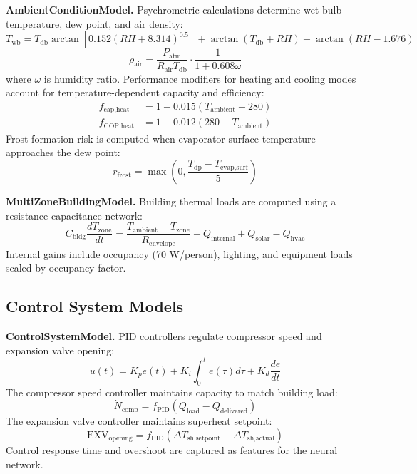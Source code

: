 \documentclass[11pt]{article}
\begin{document}
\textbf{AmbientConditionModel.} Psychrometric calculations determine wet-bulb temperature, dew point, and air density:
\begin{equation}
T_{\text{wb}} = T_{\text{db}} \arctan\left[0.152(RH + 8.314)^{0.5}\right] + \arctan(T_{\text{db}} + RH) - \arctan(RH - 1.676)
\end{equation}
\begin{equation}
\rho_{\text{air}} = \frac{P_{\text{atm}}}{R_{\text{air}} T_{\text{db}}} \cdot \frac{1}{1 + 0.608 \omega}
\end{equation}
where $\omega$ is humidity ratio. Performance modifiers for heating and cooling modes account for temperature-dependent capacity and efficiency:
\begin{align}
f_{\text{cap,heat}} &= 1 - 0.015(T_{\text{ambient}} - 280) \\
f_{\text{COP,heat}} &= 1 - 0.012(280 - T_{\text{ambient}})
\end{align}
Frost formation risk is computed when evaporator surface temperature approaches the dew point:
\begin{equation}
r_{\text{frost}} = \max\left(0, \frac{T_{\text{dp}} - T_{\text{evap,surf}}}{5}\right)
\end{equation}

\textbf{MultiZoneBuildingModel.} Building thermal loads are computed using a resistance-capacitance network:
\begin{equation}
C_{\text{bldg}} \frac{dT_{\text{zone}}}{dt} = \frac{T_{\text{ambient}} - T_{\text{zone}}}{R_{\text{envelope}}} + \dot{Q}_{\text{internal}} + \dot{Q}_{\text{solar}} - \dot{Q}_{\text{hvac}}
\end{equation}
Internal gains include occupancy (70 W/person), lighting, and equipment loads scaled by occupancy factor.

\subsection{Control System Models}

\textbf{ControlSystemModel.} PID controllers regulate compressor speed and expansion valve opening:
\begin{equation}
u(t) = K_p e(t) + K_i \int_0^t e(\tau) d\tau + K_d \frac{de}{dt}
\end{equation}
The compressor speed controller maintains capacity to match building load:
\begin{equation}
\dot{N}_{\text{comp}} = f_{\text{PID}}(Q_{\text{load}} - Q_{\text{delivered}})
\end{equation}
The expansion valve controller maintains superheat setpoint:
\begin{equation}
\text{EXV}_{\text{opening}} = f_{\text{PID}}(\Delta T_{\text{sh,setpoint}} - \Delta T_{\text{sh,actual}})
\end{equation}
Control response time and overshoot are captured as features for the neural network.
\end{document}
